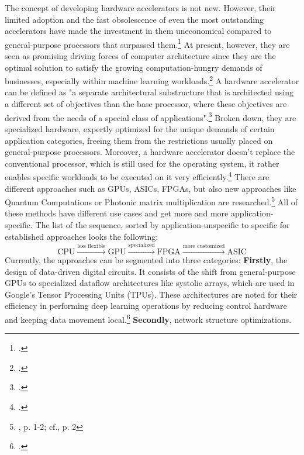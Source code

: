 The concept of developing hardware accelerators is not new.
However, their limited adoption and the fast obsolescence of even the most outstanding accelerators have made the investment in them uneconomical compared to general-purpose processors that surpassed them.\footcite[cf.][2]{peccerilloSurveyHardwareAccelerators2022}
At present, however, they are seen as promising driving forces of computer architecture since they are the optimal solution to satisfy the growing computation-hungry demands of businesses, especially within machine learning workloads.\footcite[cf.][2-3]{peccerilloSurveyHardwareAccelerators2022}
A hardware accelerator can be defined as "a separate architectural substructure that is architected using a different set of objectives than the base processor, where these objectives are derived from the needs of a special class of applications".\footcite[cf.][2]{peccerilloSurveyHardwareAccelerators2022}
Broken down, they are specialized hardware, expertly optimized for the unique demands of certain application categories, freeing them from the restrictions usually placed on general-purpose processors.
Moreover, a hardware accelerator doesn't replace the conventional processor, which is still used for the operating system, it rather enables specific workloads to be executed on it very efficiently.\footcite[cf.][2-3]{peccerilloSurveyHardwareAccelerators2022}
There are different approaches such as \ac{GPU}s, \ac{ASIC}s, \ac{FPGA}s, but also new approaches like Quantum Computations or Photonic matrix multiplication are researched.\footnote{\cite{zhouPhotonicMatrixMultiplication2022}, p. 1-2; cf.\cite{baischerLearningHardwareTutorial2021}, p. 2}
All of these methods have different use cases and get more and more application-specific. The list of the sequence, sorted by application-unspecific to specific for established approaches looks the following:
\[
\text{CPU} \xrightarrow{\text{less flexible}} \text{GPU} \xrightarrow{\text{specialized}} \text{FPGA} \xrightarrow{\text{more customized}} \text{ASIC}
\]
Currently, the approaches can be segmented into three categories:
\textbf{Firstly}, the design of data-driven digital circuits.
It consists of the shift from general-purpose GPUs to specialized dataflow architectures like systolic arrays, which are used in Google’s Tensor Processing Units (TPUs).
These architectures are noted for their efficiency in performing deep learning operations by reducing control hardware and keeping data movement local.\footcite[cf.][3883]{lehnertMostResourceEfficient2023}
\textbf{Secondly}, network structure optimizations. 
